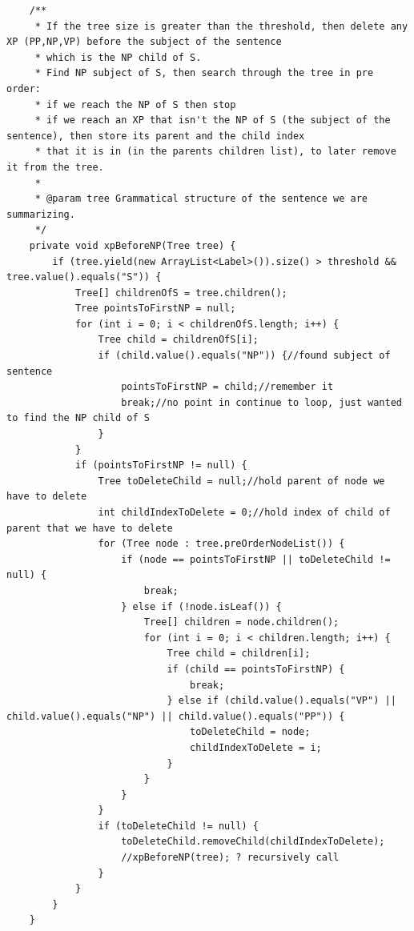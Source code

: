 \begin{lstlisting}
    /**
     * If the tree size is greater than the threshold, then delete any XP (PP,NP,VP) before the subject of the sentence
     * which is the NP child of S.
     * Find NP subject of S, then search through the tree in pre order:
     * if we reach the NP of S then stop
     * if we reach an XP that isn't the NP of S (the subject of the sentence), then store its parent and the child index
     * that it is in (in the parents children list), to later remove it from the tree.
     *
     * @param tree Grammatical structure of the sentence we are summarizing.
     */
    private void xpBeforeNP(Tree tree) {
        if (tree.yield(new ArrayList<Label>()).size() > threshold && tree.value().equals("S")) {
            Tree[] childrenOfS = tree.children();
            Tree pointsToFirstNP = null;
            for (int i = 0; i < childrenOfS.length; i++) {
                Tree child = childrenOfS[i];
                if (child.value().equals("NP")) {//found subject of sentence
                    pointsToFirstNP = child;//remember it
                    break;//no point in continue to loop, just wanted to find the NP child of S
                }
            }
            if (pointsToFirstNP != null) {
                Tree toDeleteChild = null;//hold parent of node we have to delete
                int childIndexToDelete = 0;//hold index of child of parent that we have to delete
                for (Tree node : tree.preOrderNodeList()) {
                    if (node == pointsToFirstNP || toDeleteChild != null) {
                        break;
                    } else if (!node.isLeaf()) {
                        Tree[] children = node.children();
                        for (int i = 0; i < children.length; i++) {
                            Tree child = children[i];
                            if (child == pointsToFirstNP) {
                                break;
                            } else if (child.value().equals("VP") || child.value().equals("NP") || child.value().equals("PP")) {
                                toDeleteChild = node;
                                childIndexToDelete = i;
                            }
                        }
                    }
                }
                if (toDeleteChild != null) {
                    toDeleteChild.removeChild(childIndexToDelete);
                    //xpBeforeNP(tree); ? recursively call
                }
            }
        }
    }


\end{lstlisting}
